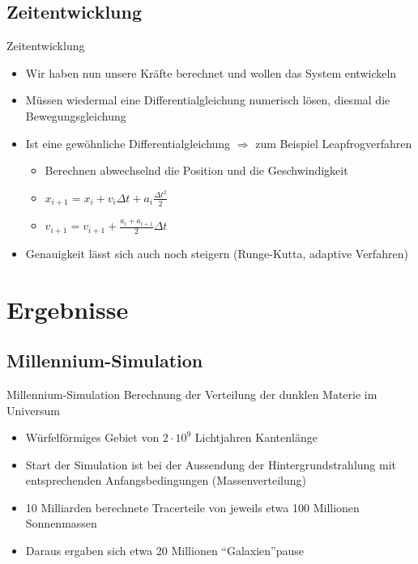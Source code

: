 \documentclass{beamer}
\begin{document}
\subsection*{Zeitentwicklung}
\begin{frame}{Zeitentwicklung}
  \begin{itemize}
    \item<+-> Wir haben nun unsere Kräfte berechnet und wollen das System entwickeln
    \item<+-> Müssen wiedermal eine Differentialgleichung numerisch lösen, diesmal
      die Bewegungsgleichung
    \item<+-> Ist eine gewöhnliche Differentialgleichung $\Rightarrow$ zum Beispiel
      Leapfrogverfahren
      \begin{itemize}
        \item<+-> Berechnen abwechselnd die Position und die Geschwindigkeit
        \item<+-> $x_{i+1} = x_i + v_{i}\Delta t + a_i\frac{\Delta t^2}{2}$
        \item<+-> $v_{i+1} = v_{i+1} + \frac{a_i + a_{i+1}}{2}\Delta t$
      \end{itemize}
    \item<+-> Genauigkeit lässt sich auch noch steigern (Runge-Kutta, adaptive
      Verfahren)
  \end{itemize}
\end{frame}

\section{Ergebnisse}
\subsection*{Millennium-Simulation}
\begin{frame}{Millennium-Simulation}
  Berechnung der Verteilung der dunklen Materie im Universum
  \begin{itemize}
    \item Würfelförmiges Gebiet von $2\cdot 10^9$ Lichtjahren Kantenlänge
    \item Start der Simulation ist bei der Aussendung der Hintergrundstrahlung
      mit entsprechenden Anfangsbedingungen (Massenverteilung)
    \item 10 Milliarden berechnete Tracerteile von jeweils etwa 100 Millionen
      Sonnenmassen
      \pause
    \item Daraus ergaben sich etwa 20 Millionen "`Galaxien"'pause
  \end{itemize}
\end{frame}
\end{document}
